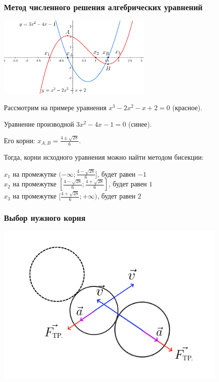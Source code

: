 \documentclass[xetex,aspectratio=43]{beamer}
\begin{document}
\begin{frame}
    \frametitle{Метод численного решения алгебрических уравнений}

    \centerline{\includegraphics[height=4cm]{equation_deg3_plot}}

    \small

    Рассмотрим на примере уравнения \(x^3-2x^2-x+2=0\) (красное).

    Уравнение производной \(3x^2-4x-1=0\) (синее).

    Его корни: \(x_{A,B} = \frac{4 \pm \sqrt{28}}{6}\).

    Тогда, корни исходного уравнения можно найти методом бисекции:

    \(x_1\) на промежутке \((-\infty; \frac{4 - \sqrt{28}}{6}]\), будет равен \(-1\)\\
    \(x_2\) на промежутке \([\frac{4 - \sqrt{28}}{6}; \frac{4 + \sqrt{28}}{6}]\), будет равен \(1\)\\
    \(x_3\) на промежутке \([\frac{4 + \sqrt{28}}{6}; +\infty)\), будет равен \(2\)

\end{frame}

\begin{frame}
    \frametitle{Выбор нужного корня}

    \includegraphics[height=8cm]{body_second_root}
\end{frame}
\end{document}
